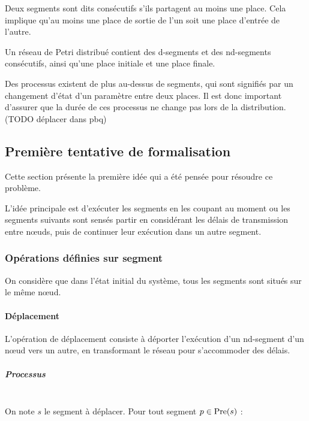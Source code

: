 \begin{mydef}
Deux segments sont dits consécutifs s'ils partagent au moins une place. Cela implique qu'au moins une place de sortie de l'un soit une place d'entrée de l'autre.
\end{mydef}

Un réseau de Petri distribué contient des d-segments et des nd-segments consécutifs, ainsi qu'une place initiale et une place finale.

Des processus existent de plus au-dessus de segments, qui sont signifiés par un changement d'état d'un paramètre entre deux places. Il est donc important d'assurer que la durée de ces processus ne change pas lors de la distribution. (TODO déplacer dans pbq)

\subsection{Première tentative de formalisation}
Cette section présente la première idée qui a été pensée pour résoudre ce problème.

L'idée principale est d'exécuter les segments en les coupant au moment ou les segments suivants sont sensés partir en considérant les délais de transmission entre nœuds, puis de continuer leur exécution dans un autre segment.
 
\subsubsection{Opérations définies sur segment}
On considère que dans l'état initial du système, tous les segments sont situés sur le même nœud.

\paragraph{Déplacement}
L'opération de déplacement consiste à déporter l'exécution d'un nd-segment d'un nœud vers un autre, en transformant le réseau pour s'accommoder des délais.

\subparagraph{Processus} ~ \\

On note $s$ le segment à déplacer.
Pour tout segment $p \in \operatorname{Pre}(s)$ : 

